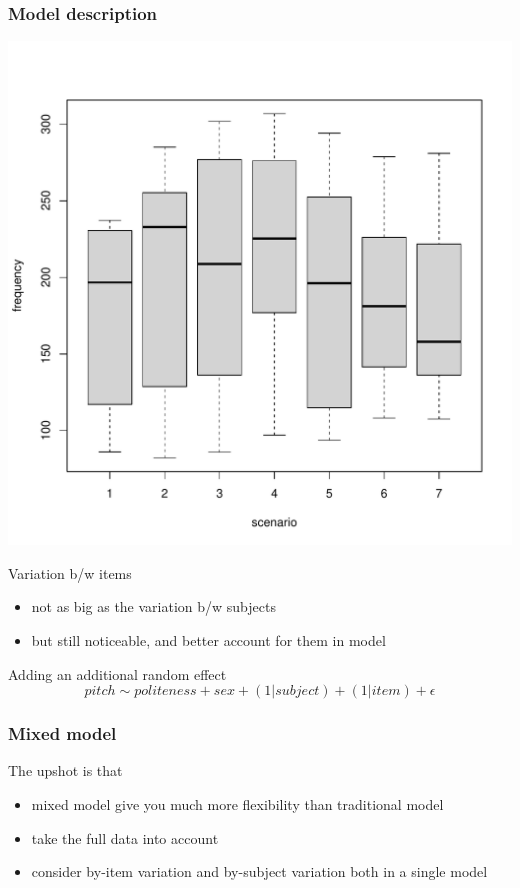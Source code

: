 \documentclass[10p]{beamer}\usepackage[]{graphicx}\usepackage[]{color}
\begin{document}
\begin{frame}
\frametitle{Model description}


\begin{center}
\includegraphics[scale=.22]{figure/box_item-1}
\end{center}
Variation b/w items
\begin{itemize}
\item not as big as the variation b/w subjects
\item but still noticeable, and better account for them in model
\end{itemize}

Adding an additional random effect
\begin{displaymath}
pitch \sim politeness + sex + (1|subject) + (1|item) + \epsilon
\end{displaymath}
\end{frame}

\begin{frame}
\frametitle{Mixed model}
The upshot is that
\begin{itemize}
\item mixed model give you much more flexibility than traditional model
\item take the full data into account
\item consider by-item variation and by-subject variation both in a single model
\end{itemize}
\end{frame}
\end{document}
